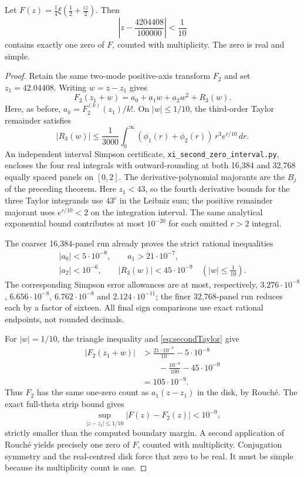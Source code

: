 \begin{theorem}
\label{thm:secondzerodisk}
Let $F(z)=\tfrac14\xi(\tfrac12+\tfrac{iz}{2})$.
Then
\[
\boxed{\left|z-\frac{4204408}{100000}\right|
<\frac1{10}}
\]
contains exactly one zero of $F$,
counted with multiplicity. The zero
is real and simple.
\end{theorem}
\begin{proof}
Retain the same two-mode
positive-axis transform $F_2$
and set $z_1=42.04408$.
Writing $w=z-z_1$ gives
\[
F_2(z_1+w)=a_0+a_1w+a_2w^2+R_3(w).
\]
Here, as before, $a_k=F_2^{(k)}(z_1)/k!$.
On $|w|\le1/10$, the third-order
Taylor remainder satisfies
\[
|R_3(w)|\le\frac{1}{3000}
\int_0^\infty
(\phi_1(r)+\phi_2(r))\,r^3e^{r/10}\,dr.
\]
An independent interval
Simpson certificate,
\texttt{xi\_second\_zero\_interval.py},
encloses the four real
integrals with outward-rounding
at both 16,384 and 32,768
equally spaced panels on $[0,2]$.
The derivative-polynomial majorants
are the $B_j$ of the preceding theorem.
Here $z_1<43$, so the fourth
derivative bounds for the
three Taylor integrands use
$43^c$ in the Leibniz
sum; the positive remainder
majorant uses $e^{r/10}<2$
on the integration interval.
The same analytical exponential
bound contributes at most $10^{-20}$
for each omitted $r>2$ integral.

The coarser 16,384-panel
run already proves the
strict rational inequalities
\begin{equation}\label{eq:secondTaylor}
\boxed{\begin{gathered}
|a_0|<5\cdot10^{-8},\qquad
a_1>21\cdot10^{-7},\\
|a_2|<10^{-6},\qquad
|R_3(w)|<45\cdot10^{-9}
\quad(|w|\le\tfrac1{10}).
\end{gathered}}
\end{equation}
The corresponding Simpson
error allowances are at most,
respectively,
$3.276\cdot10^{-8}$,
$6.656\cdot10^{-8}$,
$6.762\cdot10^{-8}$ and
$2.124\cdot10^{-11}$;
the finer 32,768-panel
run reduces each by a factor
of sixteen.
All final sign comparisons
use exact rational endpoints,
not rounded decimals.

For $|w|=1/10$,
the triangle inequality
and \eqref{eq:secondTaylor}
give
\begin{align*}
|F_2(z_1+w)|
&>\frac{21\cdot10^{-7}}{10}
-5\cdot10^{-8}\\
&\qquad-\frac{10^{-6}}{100}
-45\cdot10^{-9}\\
&=105\cdot10^{-9}.
\end{align*}
Thus $F_2$ has the same one-zero
count as $a_1(z-z_1)$ in
the disk, by Rouch\'e.
The exact full-theta
strip bound gives
\[
\sup_{|z-z_1|\le1/10}
|F(z)-F_2(z)|<10^{-9},
\]
strictly smaller than the
computed boundary margin.
A second application of
Rouch\'e yields precisely one
zero of $F$, counted with
multiplicity.
Conjugation symmetry and
the real-centred disk
force that zero to be real.
It must be simple because
its multiplicity count is one.
\end{proof}

